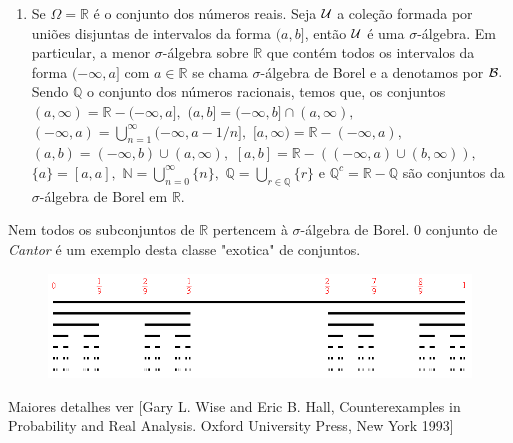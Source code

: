\begin{frame}
\begin{exem}
\begin{enumerate}
	

	\item  Se $\Omega =\mathbb{R}$ é o conjunto dos números reais. Seja ${\cal U}$ a
	coleção formada por uniões disjuntas de intervalos da forma $(a,b]$, então
	${\cal U}$  é uma $\sigma$-álgebra. Em particular, a menor $\sigma$-álgebra
	sobre $\mathbb{R}$ que contém todos os intervalos da forma $(-\infty,a]$ com $a
	\in \mathbb{R}$ se chama $\sigma$-álgebra de Borel e a denotamos por ${\cal
		B}.$ Sendo $\mathbb{Q}$ o conjunto dos números racionais, temos que, os conjuntos 
	$(a, \infty)=\mathbb{R}-(-\infty,a],$ 
	$(a,b]=(-\infty, b]\cap (a, \infty),$  
	$(-\infty,a)=\bigcup_{n=1}^\infty(-\infty,a- 1/n],$ $[a,\infty) = \mathbb{R}-(-\infty, a),$
	$(a,b) = (-\infty, b)\cup (a, \infty),$ $[a,b] = \mathbb{R}-((-\infty, a)\cup
	(b, \infty)),$  $\{a\}=[a,a],$ $\mathbb{N}=\bigcup_{n=0}^\infty\{n\},$
	$\mathbb{Q}=\bigcup_{r \in \mathbb{Q}}\{r\}$ e
	$\mathbb{Q}^c=\mathbb{R}-\mathbb{Q}$  são conjuntos da $\sigma$-álgebra de Borel
	em $\mathbb{R}.$
	\end{enumerate} 
%

\end{exem} 
\begin{nota}
Nem todos os subconjuntos de $\mathbb{R}$ pertencem à $\sigma$-álgebra de Borel. 0 conjunto de {\it Cantor} é um exemplo desta classe "exotica" de conjuntos.

\begin{figure}[!htb]
	\begin{center}
		\includegraphics[angle=0, scale=0.32]{Conjunto_de_Cantor.png}
	\end{center}
\end{figure} 
 
 Maiores detalhes ver [Gary L. Wise and Eric B. Hall, Counterexamples in Probability and Real Analysis. Oxford University Press, New York 1993]
\end{nota}


\end{frame}

